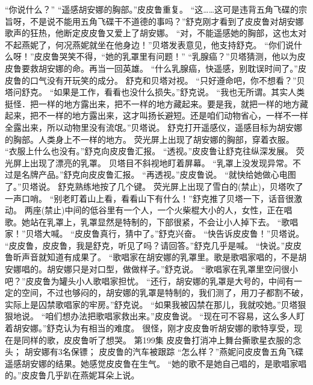 \documentclass[a4paper,12pt,UTF8,twoside]{ctexbook}
\begin{document}
        “你说什么？” 
        “遥感胡安娜的胸部。”皮皮鲁重复。 
        “这……这可是违背五角飞碟的宗旨呀，不是说不能用五角飞碟干不道德的事吗？”舒克刚才看到了皮皮鲁对胡安娜歌声的狂热，他断定皮皮鲁又爱上了胡安娜。 
        “对，不能遥感她的胸部，这也太对不起燕妮了，何况燕妮就坐在他身边！”贝塔发表意见，他支持舒克。 
        “你们说什么呀！”皮皮鲁哭笑不得，“她的乳罩里有问题！” 
        “乳腺癌？”贝塔猜测，他以为皮皮鲁要救胡安娜的命。再当一回英雄。 
        “什么乳腺癌，快遥感，别耽误时间了。”皮皮鲁的口气没有开玩笑的成分。 
        舒克和贝塔对视。 
        “只好遵命吧，你不想看？”贝塔问舒克。 
        “如果是工作，看看也没什么损失。”舒克说。 
        “我也无所谓。其实人类挺怪．把一样的地方露出来，把不一样的地方藏起来。要是我，就把一样的地方藏起来，把不一样的地方露出来，这才叫扬长避短。还是咱们动物省心，一样不一样全露出来，所以动物里没有流氓。”贝塔说。 
        舒克打开遥感仪，遥感目标为胡安娜的胸部。人类身上不一样的地方。 
        荧光屏上出现了胡安娜的胸部，穿着衣服。 
        “衣服上什么也没有。”舒克向皮皮鲁汇报。 
        “透视。”皮皮鲁让舒克往纵深发展。 
        荧光屏上出现了漂亮的乳罩。 
        贝塔目不斜视地盯着屏幕。 
        “乳罩上没发现异常。不过是名牌产品。”舒克向皮皮鲁汇报。 
        “再透视。”皮皮鲁说。 
        “就快给她做心电图了。”贝塔说。 
        舒克熟练地按了几个键。 
        荧光屏上出现了雪白的(禁止)，贝塔吹了一声口哨。 
        “别老盯着山上看，看看山下有什么！”舒克推了贝塔一下，话音很激动。 
        两座(禁止)中间的低谷里有一个人，一个火柴棍大小的人，女性，正在唱歌。她站在乳罩上，乳罩显然是特制的，下部很紧，不会让小人掉下去。 
        “歌唱家！”贝塔大喊。 
        “皮皮鲁真行，猜中了。”舒克兴奋。 
        “快告诉皮皮鲁！”贝塔说。 
        “皮皮鲁，皮皮鲁，我是舒克，听见了吗？请回答。”舒克几乎是喊。 
        “快说。”皮皮鲁昕声音就知道有成果了。 
        “歌唱家在胡安娜的乳罩里。歌是歌唱家唱的，不是胡安娜唱的。胡安娜只是对口型，做做样子。”舒克说。 
        “歌唱家在乳罩里空问很小吧？”皮皮鲁为罐头小人歌唱家担忧。 
        “还行，胡安娜的乳罩是大号的，中间有一定的空间，不过也够闷的，胡安娜的乳罩是特制的，我们测了，用刀子都割不破，实际上是囚禁歌唱家的牢房。”舒克说。 
        “如果我被囚禁在那儿，我就咬她。”贝塔狠狠地说。 
        “咱们想办法把歌唱家救出来。”皮皮鲁说。 
        “现在可不容易，这么多人盯着胡安娜。”舒克认为有相当的难度。 
        很怪，刚才皮皮鲁听胡安娜的歌特享受，现在是同样的歌，皮皮鲁听了想哭。       第199集 
        皮皮鲁打消冲上舞台撕歌星衣服的念头； 
        胡安娜有3名保镖； 
        皮皮鲁的汽车被跟踪   
        “怎么样？”燕妮问皮皮鲁五角飞碟遥感胡安娜的结果。她感觉皮皮鲁在生气。 
        “她的歌不是她自己唱的，是歌唱家唱的。”皮皮鲁几乎趴在燕妮耳朵上说。 
\end{document}

